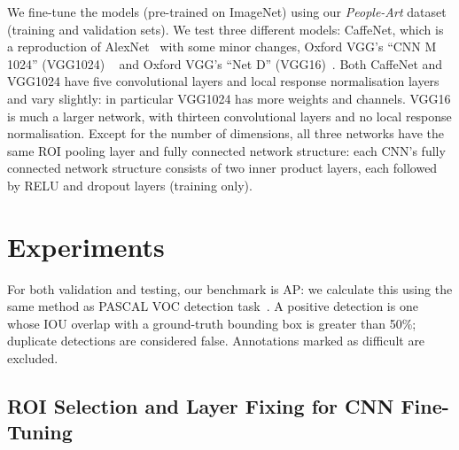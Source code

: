\documentclass[runningheads]{llncs}
\begin{document}
We fine-tune the models (pre-trained on ImageNet) using our \textit{People-Art} dataset (training and validation sets).
We test three different models: CaffeNet, which is a reproduction of AlexNet~\cite{krizhevsky2012imagenet} with some minor changes, Oxford VGG's ``CNN M 1024'' (VGG1024) ~\cite{chatfield2014return} and Oxford VGG's ``Net D'' (VGG16)~\cite{simonyan2014very}. 
Both CaffeNet and VGG1024 have five convolutional layers and local response normalisation layers and vary slightly: in particular VGG1024 has more weights and channels.
VGG16 is much a larger network, with thirteen convolutional layers and no local response normalisation.
Except for the number of dimensions, all three networks have the same \ac{ROI} pooling layer and fully connected network structure: each CNN's fully connected network structure consists of two inner product layers, each followed by \ac{RELU} and dropout layers (training only).
 
\section{Experiments}
For both validation and testing, our benchmark is \acf{AP}: we calculate this using the same method as PASCAL \ac{VOC} detection task~\cite{everingham2007pascal}.
A positive detection is one whose \ac{IOU} overlap with a ground-truth bounding box is greater than 50\%;
duplicate detections are considered false.
Annotations marked as difficult are excluded.

\subsection{\ac{ROI} Selection and Layer Fixing for \ac{CNN} Fine-Tuning}
\label{sec:ROISelection}
\end{document}
